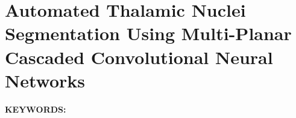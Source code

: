 \renewcommand{\figurepath}[1]{Chapters/thalamus/figures/#1}

\chapter{Automated Thalamic Nuclei Segmentation Using Multi-Planar Cascaded Convolutional Neural Networks}\label{ch:thalamus}

%

\textbf{KEYWORDS:\ } %

\newpage


